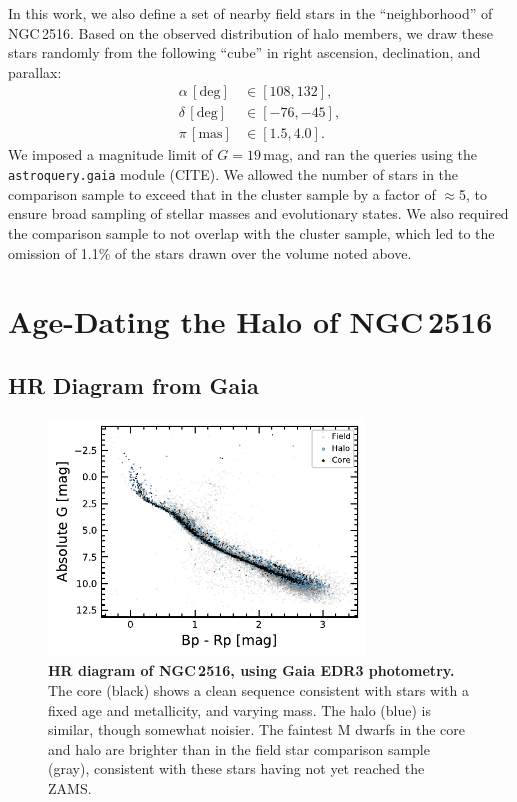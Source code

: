 \documentclass[12pt,twocolumn,tighten]{aastex63}
\newcommand{\cn}{NGC\,2516} %
\begin{document}
In this work, we also define a set of nearby field stars in the
``neighborhood'' of \cn.  Based on the observed distribution of halo
members, we draw these stars randomly from the following ``cube'' in
right ascension, declination, and parallax:
\begin{align}
  \alpha\,[\mathrm{deg}] &\in [108, 132], \\
  \delta\,[\mathrm{deg}] &\in [-76, -45], \\
  \pi\,[\mathrm{mas}] &\in [1.5, 4.0].
\end{align}
We imposed a magnitude limit of $G=19$\,mag, and ran the queries
using the \texttt{astroquery.gaia} module (CITE).
We allowed the number of stars in the comparison sample to exceed that
in the cluster sample by a factor of $\approx$5, to ensure broad sampling
of stellar masses and evolutionary states.
We also required the comparison sample to not overlap with the cluster
sample, which led to the omission of 1.1\% of the stars drawn over the
volume noted above.


\section{Age-Dating the Halo of NGC\,2516}
\label{sec:agedate}

\subsection{HR Diagram from Gaia}
\label{subsec:hr}

\begin{figure}[t]
	\begin{center}
		\leavevmode
			\includegraphics[width=0.75\textwidth]{f2a.pdf}
	\end{center}
	\vspace{-0.7cm}
  \caption{ {\bf HR diagram of NGC\,2516, using Gaia EDR3 photometry.}
    The core (black) shows a clean sequence consistent with
    stars with a fixed age and metallicity, and varying mass.  The
    halo (blue) is similar, though somewhat noisier.  The faintest M
    dwarfs in the core and halo are brighter than in the field star
    comparison sample (gray), consistent with these stars having not
    yet reached the ZAMS.
    \label{fig:hr}
  }
\end{figure}
\end{document}
